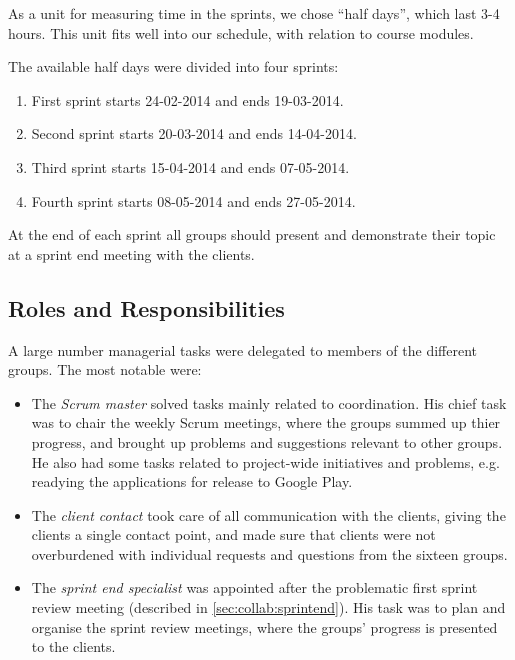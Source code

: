 As a unit for measuring time in the sprints, we chose ``half days'', which last 3-4 hours. This unit fits well into our schedule, with relation to course modules.

The available half days were divided into four sprints:

\begin{enumerate}
\item First sprint starts 24-02-2014 and ends 19-03-2014.
\item Second sprint starts 20-03-2014 and ends 14-04-2014.
\item Third sprint starts 15-04-2014 and ends 07-05-2014.
\item Fourth sprint starts 08-05-2014 and ends 27-05-2014.
\end{enumerate}

At the end of each sprint all groups should present and demonstrate their topic at a sprint end meeting with the clients.

\subsection{Roles and Responsibilities}
\label{sec:collab:multiproject:roles}
A large number managerial tasks were delegated to members of the different groups. The most notable were:
\begin{itemize}
	\item The \textit{Scrum master} solved tasks mainly related to coordination. His chief task was to chair the weekly Scrum meetings, where the groups summed up thier progress, and brought up problems and suggestions relevant to other groups. He also had some tasks related to project-wide initiatives and problems, e.g. readying the applications for release to Google Play.
	\item The \textit{client contact} took care of all communication with the clients, giving the clients a single contact point, and made sure that clients were not overburdened with individual requests and questions from the sixteen groups. 
	\item The \textit{sprint end specialist} was appointed after the problematic first sprint review meeting (described in \cref{sec:collab:sprintend}). His task was to plan and organise the sprint review meetings, where the groups' progress is presented to the clients.
\end{itemize}
